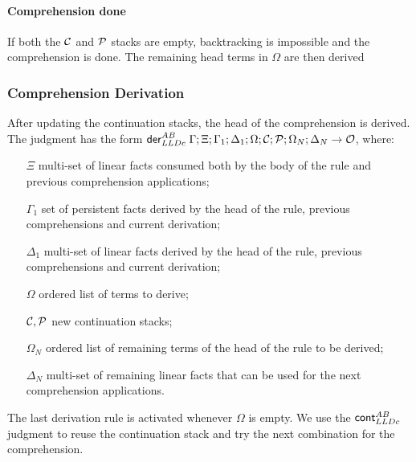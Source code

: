\paragraph{Comprehension done}

If both the $\mathcal{C}$ and $\mathcal{P}$ stacks are empty, backtracking is impossible and the
comprehension is done. The remaining head terms in $\Omega$ are then derived



\subsubsection{Comprehension Derivation}

After updating the continuation stacks, the head of the comprehension is
derived. The judgment has the form $\mathsf{der}_{LLDc}^{AB} \; \Gamma; \Xi; \Gamma_1; \Delta_1;
\Omega; \mathcal{C}; \mathcal{P}; \Omega_N; \Delta_N \rightarrow \mathcal{O}$, where:

\begin{enumerate}
   \item[$\Xi$] multi-set of linear facts consumed both by the body of the rule
   and previous comprehension applications;
   \item[$\Gamma_1$] set of persistent facts derived by the head of the rule,
   previous comprehensions and current derivation;
   \item[$\Delta_1$] multi-set of linear facts derived by the head of the rule,
   previous comprehensions and current derivation;
   \item[$\Omega$] ordered list of terms to derive;
   \item[$\mathcal{C}, \mathcal{P}$] new continuation stacks;
   \item[$\Omega_N$] ordered list of remaining terms of the head of the rule to
   be derived;
   \item[$\Delta_N$] multi-set of remaining linear facts that can be used for
   the next comprehension applications.
\end{enumerate}



The last derivation rule is activated whenever $\Omega$ is empty. We use the
$\mathsf{cont}_{LLDc}^{AB} \;$judgment to reuse the continuation stack
and try the next combination for the comprehension.


